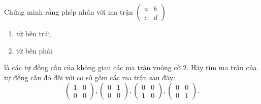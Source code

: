 \documentclass[class=nhvh-linear-algebra,crop=false]{standalone}
\begin{document}
\begin{exercise}
    Chứng minh rằng phép nhân với ma trận $\begin{pmatrix}a & b \\ c & d\end{pmatrix}$
    \begin{enumerate}[label = (\alph*)]
        \item từ bên trái,
        \item từ bên phải
    \end{enumerate}
    \par là các tự đồng cấu của không gian các ma trận vuông cỡ 2. Hãy tìm ma trận của tự đồng cấu đó đối với cơ sở gồm các ma trận sau đây:
    \[
        \begin{pmatrix}
            1 & 0 \\
            0 & 0
        \end{pmatrix},
        \begin{pmatrix}
            0 & 1 \\
            0 & 0
        \end{pmatrix},
        \begin{pmatrix}
            0 & 0 \\
            1 & 0
        \end{pmatrix},
        \begin{pmatrix}
            0 & 0 \\
            0 & 1
        \end{pmatrix}.
    \]
\end{exercise}
\end{document}
